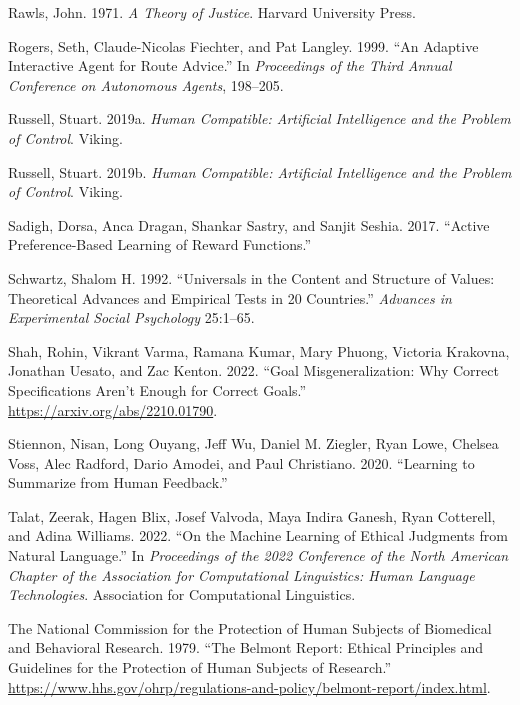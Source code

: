 \documentclass[
  letterpaper,
  DIV=11,
  numbers=noendperiod,
  oneside]{scrreprt}
\newlength{\cslhangindent}
\newenvironment{CSLReferences}[2] %
 {\begin{list}{}{%
  \setlength{\itemindent}{0pt}
  \setlength{\leftmargin}{0pt}
  \setlength{\parsep}{0pt}
  \ifodd #1
   \setlength{\leftmargin}{\cslhangindent}
   \setlength{\itemindent}{-1\cslhangindent}
  \fi
  \setlength{\itemsep}{#2\baselineskip}}}
 {\end{list}}
\theoremstyle{remark}
\begin{document}
\begin{CSLReferences}{1}{0}
Rawls, John. 1971. \emph{A Theory of Justice}. Harvard University Press.

Rogers, Seth, Claude-Nicolas Fiechter, and Pat Langley. 1999. {``An
Adaptive Interactive Agent for Route Advice.''} In \emph{Proceedings of
the Third Annual Conference on Autonomous Agents}, 198--205.

Russell, Stuart. 2019a. \emph{Human Compatible: Artificial Intelligence
and the Problem of Control}. Viking.

Russell, Stuart. 2019b. \emph{Human Compatible: Artificial Intelligence
and the Problem of Control}. Viking.

Sadigh, Dorsa, Anca Dragan, Shankar Sastry, and Sanjit Seshia. 2017.
{``Active Preference-Based Learning of Reward Functions.''}

Schwartz, Shalom H. 1992. {``Universals in the Content and Structure of
Values: Theoretical Advances and Empirical Tests in 20 Countries.''}
\emph{Advances in Experimental Social Psychology} 25:1--65.

Shah, Rohin, Vikrant Varma, Ramana Kumar, Mary Phuong, Victoria
Krakovna, Jonathan Uesato, and Zac Kenton. 2022. {``Goal
Misgeneralization: Why Correct Specifications Aren't Enough for Correct
Goals.''} \url{https://arxiv.org/abs/2210.01790}.

Stiennon, Nisan, Long Ouyang, Jeff Wu, Daniel M. Ziegler, Ryan Lowe,
Chelsea Voss, Alec Radford, Dario Amodei, and Paul Christiano. 2020.
{``Learning to Summarize from Human Feedback.''}

Talat, Zeerak, Hagen Blix, Josef Valvoda, Maya Indira Ganesh, Ryan
Cotterell, and Adina Williams. 2022. {``On the Machine Learning of
Ethical Judgments from Natural Language.''} In \emph{Proceedings of the
2022 {Conference} of the {North} {American} {Chapter} of the
{Association} for {Computational} {Linguistics}: {Human} {Language}
{Technologies}}. Association for Computational Linguistics.

The National Commission for the Protection of Human Subjects of
Biomedical and Behavioral Research. 1979. {``The Belmont Report: Ethical
Principles and Guidelines for the Protection of Human Subjects of
Research.''}
\url{https://www.hhs.gov/ohrp/regulations-and-policy/belmont-report/index.html}.


\end{CSLReferences}
\end{document}
